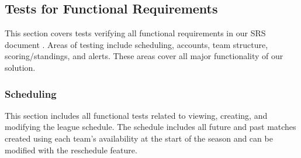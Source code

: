 \documentclass[12pt, titlepage]{article}
\begin{document}
\subsection{Tests for Functional Requirements}

This section covers tests verifying all functional requirements in our SRS
document \cite{SRS}. Areas of testing include scheduling, accounts, team
structure, scoring/standings, and alerts. These areas cover all major
functionality of our solution.

\subsubsection{Scheduling}

This section includes all functional tests related to viewing, creating, and
modifying the league schedule. The schedule includes all future and past
matches created using each team's availability at the start of the season and
can be modified with the reschedule feature.
\end{document}
